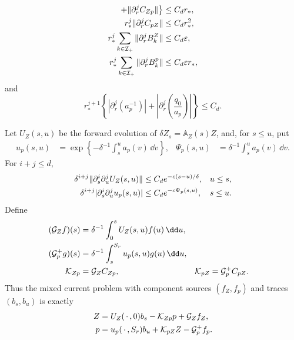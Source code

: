 \begin{lemma}
\begin{align}
              +\|\partial_r^jC_{Zp}\|\bigr\}
 &\le C_dr_*,\notag\\
 r_*^j\|\partial_r^jC_{pZ}\|
 &\le C_dr_*^2,\notag\\
 r_*^j\sum_{k\in\mathcal I_+}\|\partial_r^jB_k^Z\|
 &\le C_d\varepsilon,\notag\\
 r_*^j\sum_{k\in\mathcal I_+}\|\partial_r^jB_k^p\|
 &\le C_d\varepsilon r_*,                                  \label{eq:repelling-weighted-block-jets}
\end{align}
and
\begin{equation}
 r_*^{j+1}\left\{
  |\partial_r^j(a_p^{-1})|
  +\left|\partial_r^j\!\left(\frac{q_0}{a_p}\right)\right|
 \right\}\le C_d.                                  \label{eq:repelling-inverse-coefficient-jets}
\end{equation}

Let \(U_Z(s,u)\) be the forward evolution of
\(\delta Z_s=\mathbb A_Z(s)Z\), and, for \(s\le u\), put
\begin{align}
 u_p(s,u)
 &=\exp\left\{-\delta^{-1}\int_s^ua_p(v)\,\dd v\right\},
 &\Psi_p(s,u)&=\delta^{-1}\int_s^ua_p(v)\,\dd v. \label{eq:repelling-component-kernels}
\end{align}
For \(i+j\le d\),
\begin{align}
 \delta^{i+j}\|\partial_s^i\partial_u^jU_Z(s,u)\|
 &\le C_de^{-c(s-u)/\delta},&&u\le s,\notag\\
 \delta^{i+j}|\partial_s^i\partial_u^ju_p(s,u)|
 &\le C_de^{-c\Psi_p(s,u)},&&s\le u.             \label{eq:repelling-component-kernel-bounds}
\end{align}
Define
\begin{align}
 (\mathcal G_Zf)(s)
 &=\delta^{-1}\int_0^sU_Z(s,u)f(u)\,\dd u,\notag\\
 (\mathcal G_p^+g)(s)
 &=\delta^{-1}\int_s^{S_r}u_p(s,u)g(u)\,\dd u,\notag\\
 \mathcal K_{Zp}&=\mathcal G_ZC_{Zp},
 &\mathcal K_{pZ}&=\mathcal G_p^+C_{pZ}.          \label{eq:repelling-component-Green-operators}
\end{align}
Thus the mixed current problem with component sources \((f_Z,f_p)\) and
traces \((b_s,b_u)\) is exactly
\begin{align}
 Z&=U_Z(\,\cdot\,,0)b_s-\mathcal K_{Zp}p
                         +\mathcal G_Zf_Z,\notag\\
 p&=u_p(\,\cdot\,,S_r)b_u+\mathcal K_{pZ}Z
                         -\mathcal G_p^+f_p.       \label{eq:repelling-component-LP}
\end{align}


\end{lemma}
